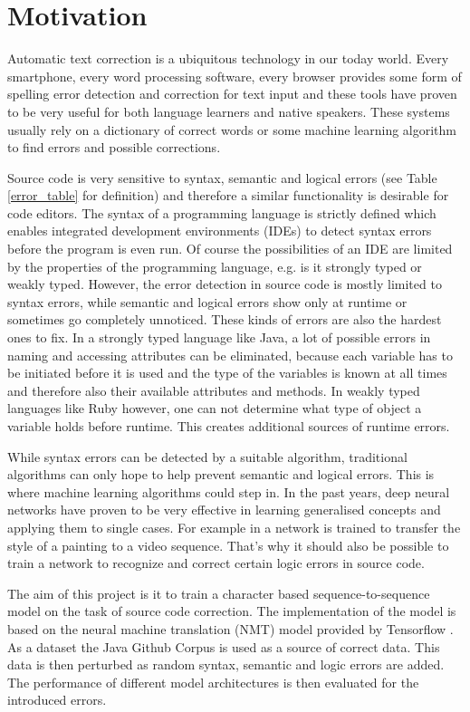 \section{Motivation}
Automatic text correction is a ubiquitous technology in our today world. Every smartphone, every word processing software, every browser provides some form of spelling error detection and correction for text input and these tools have proven to be very useful for both language learners and native speakers. These systems usually rely on a dictionary of correct words \cite{dictionary_correction, digram_correction} or some machine learning algorithm \cite{seq2seq_on_text_correction} to find errors and possible corrections.

Source code is very sensitive to syntax, semantic and logical errors (see Table \ref{error_table} for definition) and therefore a similar functionality is desirable for code editors. The syntax of a programming language is strictly defined which enables integrated development environments (IDEs) to detect syntax errors before the program is even run. Of course the possibilities of an IDE are limited by the properties of the programming language, e.g. is it strongly typed or weakly typed. However, the error detection in source code is mostly limited to syntax errors, while semantic and logical errors show only at runtime or sometimes go completely unnoticed. These kinds of errors are also the hardest ones to fix. In a strongly typed language like Java, a lot of possible errors in naming and accessing attributes can be eliminated, because each variable has to be initiated before it is used and the type of the variables is known at all times and therefore also their available attributes and methods. In weakly typed languages like Ruby however, one can not determine what type of object a variable holds before runtime. This creates additional sources of runtime errors.

While syntax errors can be detected by a suitable algorithm, traditional algorithms can only hope to help prevent semantic and logical errors. This is where machine learning algorithms could step in. In the past years, deep neural networks have proven to be very effective in learning generalised concepts and applying them to single cases. For example in \cite{style_transfer} a network is trained to transfer the style of a painting to a video sequence. That's why it should also be possible to train a network to recognize and correct certain logic errors in source code.

The aim of this project is it to train a character based sequence-to-sequence model on the task of source code correction. The implementation of the model is based on the neural machine translation (NMT) model provided by Tensorflow \cite{seq2seq_tutorial}. As a dataset the Java Github Corpus \cite{java_dataset} is used as a source of correct data. This data is then perturbed as random syntax, semantic and logic errors are added. The performance of different model architectures is then evaluated for the introduced errors.

